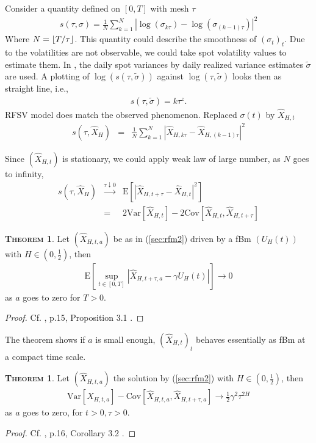 \documentclass[a4paper, twoside, 11pt]{article}
\theoremstyle{definition}
\newtheorem{theorem}[definition]{\scshape Theorem}
\DeclarePairedDelimiter\floor{\lfloor}{\rfloor}
\begin{document}
Consider a quantity defined on $[0, T]$ with mesh $\tau$
\begin{eqnarray}
  s(\tau, \sigma) = \frac{1}{N}\sum\limits_{k=1}^N|\log(\sigma_{k\tau}) - \log(\sigma_{(k-1)\tau})|^2
  \label{sec:smo}
\end{eqnarray}
Where $N = \floor{T/\tau}$. This quantity could describe the smoothness of $(\sigma_t)_t$. Due to the volatilities are not observable, we could take spot volatility values to estimate them. In \cite{chridito}, the daily spot variances by daily realized variance estimates $\tilde{\sigma}$ are used. A plotting of $\log(s(\tau, \tilde{\sigma}))$ against $\log(\tau, \tilde{\sigma})$ looks then as straight line, i.e.,
\begin{eqnarray}
  s(\tau, \tilde{\sigma}) =  k\tau^z.
  \label{sec:smth}
\end{eqnarray}
RFSV model does match the observed phenomenon. Replaced  $\sigma(t)$ by $\hat{X}_{H,t}$ 
\begin{eqnarray}
  s(\tau, \hat{X}_{H}) &=&  \frac {1}{N}\sum\limits_{k=1}^N|\hat{X}_{H,k\tau} - \hat{X}_{H,(k-1)\tau}|^2\nonumber
\end{eqnarray}

Since $(\hat{X}_{H,t})$ is stationary, we could apply weak law of large number, as $N$ goes to infinity,
\begin{eqnarray}
  s(\tau, \hat{X}_{H}) &\overset{\tau\downarrow0}{\rightarrow}& \mathrm{E}[|\hat{X}_{H,t+\tau}-\hat{X}_{H,t}|^2]\nonumber\\
  &=& 2 \mathrm{Var}[\hat{X}_{H,t}] - 2 \mathrm{Cov}[\hat{X}_{H,t}, \hat{X}_{H,t+\tau}]\nonumber
  \label{sec:smtsv}
\end{eqnarray}

\begin{theorem}
  Let $(\hat{X}_{H, t, a})$ be as in (\ref{sec:rfm2}) driven by a fBm $(U_H(t))$ with $H\in (0,\frac{1}{2})$, then
  \begin{eqnarray*}
	\mathrm{E}[\sup\limits_{t\in [0, T]}|\hat{X}_{H,t+\tau, a} - \gamma U_H(t)|]\rightarrow 0
  \end{eqnarray*}
 as $a$ goes to zero for $T > 0$.
\end{theorem}
\begin{proof}
  Cf. \cite{gradin}, p.15, Proposition 3.1 .
\end{proof}

The theorem shows if $a$ is small enough, $(\hat{X}_{H, t})_t$ behaves essentially as fBm at a compact time scale.

\begin{theorem}
  Let $(\hat{X}_{H, t, a})$ the solution by (\ref{sec:rfm2}) with $H\in(0, \frac{1}{2})$, then 
  \begin{eqnarray}
	\mathrm{Var}[\hat{X}_{H,t, a}] - \mathrm{Cov}[\hat{X}_{H,t, a}, \hat{X}_{H,t+\tau, a}] \rightarrow \frac{1}{2} \gamma^2\tau^{2H}
	\label{sec:rfsv}
  \end{eqnarray}
 as $a$ goes to zero, for $t>0, \tau>0$.
\end{theorem}
\begin{proof}
  Cf. \cite{gradin}, p.16, Corollary 3.2 .
\end{proof}
\end{document}
